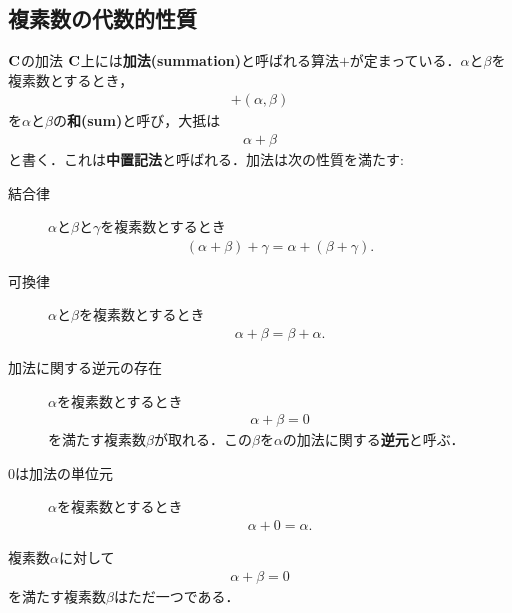 \subsection{複素数の代数的性質}
	\begin{itembox}[l]{$\mathbf{C}$の加法}
		$\mathbf{C}$上には{\bf 加法}{\bf (summation)}と呼ばれる算法$+$が定まっている．$\alpha$と$\beta$を複素数とするとき，
		\begin{align}
			+(\alpha,\beta)
		\end{align}
		を$\alpha$と$\beta$の{\bf 和}{\bf (sum)}と呼び，大抵は
		\begin{align}
			\alpha + \beta
		\end{align}
		と書く．これは{\bf 中置記法}と呼ばれる．加法は次の性質を満たす:
		\begin{description}
			\item[結合律] $\alpha$と$\beta$と$\gamma$を複素数とするとき
				\begin{align}
					(\alpha+\beta)+\gamma = \alpha+(\beta+\gamma).
				\end{align}
				
			\item[可換律]  $\alpha$と$\beta$を複素数とするとき
				\begin{align}
					\alpha + \beta = \beta + \alpha.
				\end{align}
				
			\item[加法に関する逆元の存在] $\alpha$を複素数とするとき
				\begin{align}
					\alpha + \beta = 0
				\end{align}
				を満たす複素数$\beta$が取れる．この$\beta$を$\alpha$の加法に関する{\bf 逆元}と呼ぶ．
				
			\item[$0$は加法の単位元] $\alpha$を複素数とするとき
				\begin{align}
					\alpha + 0 = \alpha.
				\end{align}
		\end{description}
	\end{itembox}
	
	\begin{screen}
		\begin{thm}[加法に関する逆元はただ一つ]
			複素数$\alpha$に対して
			\begin{align}
				\alpha + \beta = 0
			\end{align}
			を満たす複素数$\beta$はただ一つである．
		\end{thm}
	\end{screen}
	

